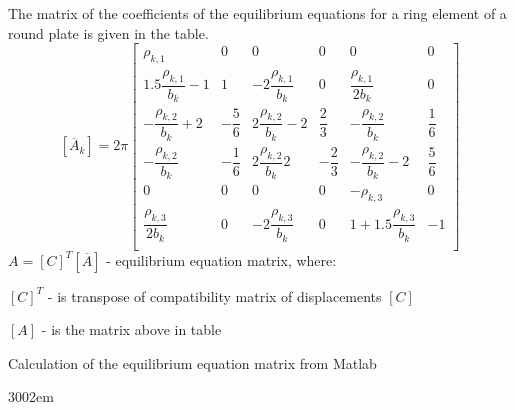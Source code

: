 The matrix of the coefficients of the equilibrium equations for a ring element of a round plate is
given in the table.
  \begin{equation}\label{eqn:eqMatrix}
    [\overline{A}_k]=2\pi
    \begin{bmatrix}
        \rho_{k,1} & 0 & 0 & 0 & 0 & 0 \\[2ex]
        1.5\dfrac{\rho_{k,1}}{b_k}-1 & 1 & -2\dfrac{\rho_{k,1}}{b_k} & 0 & \dfrac{\rho_{k,1}}{2b_k} & 0 \\[2ex]
        -\dfrac{\rho_{k,2}}{b_k}+2 & -\dfrac{5}{6} & 2\dfrac{\rho_{k,2}}{b_k}-2 & \dfrac{2}{3} & -\dfrac{\rho_{k,2}}{b_k} & \dfrac{1}{6} \\[2ex]
        -\dfrac{\rho_{k,2}}{b_k} & -\dfrac{1}{6} & 2\dfrac{\rho_{k,2}}{b_k}2 & -\dfrac{2}{3} & -\dfrac{\rho_{k,2}}{b_k}-2 & \dfrac{5}{6} \\[2ex]
        0 & 0 & 0 & 0 & -\rho_{k,3} & 0 \\[2ex]
        \dfrac{\rho_{k,3}}{2b_k} & 0 & -2\dfrac{\rho_{k,3}}{b_k} & 0 & 1+1.5\dfrac{\rho_{k,3}}{b_k} & -1 \\[2ex]
      \end{bmatrix}
  \end{equation}
$A=[C]^T[\overline{A}]$ - equilibrium equation matrix, where:\par
$[C]^T$ - is transpose of compatibility matrix of displacements $[C]$\par
$[A]$ - is the matrix above in table\par
\smallskip
Calculation of the equilibrium equation matrix from Matlab\par
\begin{xtolerant}{300}{2em}
  {\noindent \footnotesize }
  \end{xtolerant}
